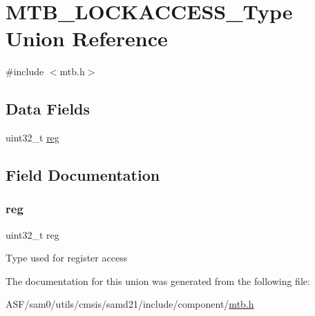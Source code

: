 \hypertarget{union_m_t_b___l_o_c_k_a_c_c_e_s_s___type}{}\section{M\+T\+B\+\_\+\+L\+O\+C\+K\+A\+C\+C\+E\+S\+S\+\_\+\+Type Union Reference}
\label{union_m_t_b___l_o_c_k_a_c_c_e_s_s___type}


{\ttfamily \#include $<$mtb.\+h$>$}

\subsection*{Data Fields}
\begin{DoxyCompactItemize}
\item 
uint32\+\_\+t \mbox{\hyperlink{union_m_t_b___l_o_c_k_a_c_c_e_s_s___type_a6b91636401516a477989a336376d7b40}{reg}}
\end{DoxyCompactItemize}


\subsection{Field Documentation}
\mbox{\label{union_m_t_b___l_o_c_k_a_c_c_e_s_s___type_a6b91636401516a477989a336376d7b40}} 
\subsubsection{\texorpdfstring{reg}{reg}}
{\footnotesize\ttfamily uint32\+\_\+t reg}

Type used for register access 

The documentation for this union was generated from the following file\+:\begin{DoxyCompactItemize}
\item 
A\+S\+F/sam0/utils/cmsis/samd21/include/component/\mbox{\hyperlink{component_2mtb_8h}{mtb.\+h}}\end{DoxyCompactItemize}
